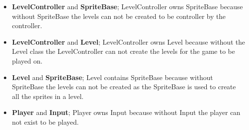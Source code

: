 \begin{itemize}
\begin{itemize}
	\item \textbf{LevelController} and \textbf{SpriteBase}; LevelController owns SpriteBase because without SpriteBase the levels can not be created to be controller by the controller.
	\item \textbf{LevelController} and \textbf{Level}; LevelController owns Level because without the Level class the LevelController can not create the levels for the game to be played on. 
	\item \textbf{Level} and \textbf{SpriteBase}; Level contains SpriteBase because without SpriteBase the levels can not be created as the SpriteBase is used to create all the sprites in a level.
	\item \textbf{Player} and \textbf{Input}; Player owns Input because without Input the player can not exist to be played.
	\end{itemize}
\end{itemize} 
